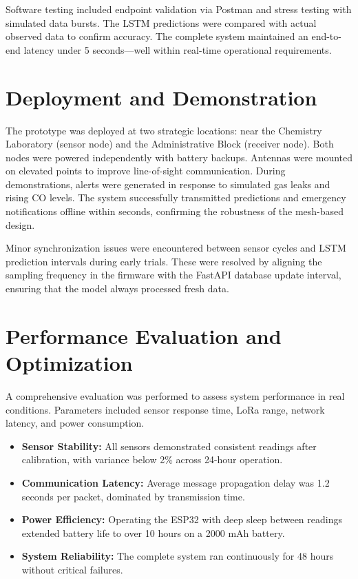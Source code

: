 Software testing included endpoint validation via Postman and stress testing with simulated data bursts. The LSTM predictions were compared with actual observed data to confirm accuracy. The complete system maintained an end-to-end latency under 5 seconds—well within real-time operational requirements.

\section{Deployment and Demonstration}
\label{sec:deployment}

The prototype was deployed at two strategic locations: near the Chemistry Laboratory (sensor node) and the Administrative Block (receiver node). Both nodes were powered independently with battery backups. Antennas were mounted on elevated points to improve line-of-sight communication. During demonstrations, alerts were generated in response to simulated gas leaks and rising CO levels. The system successfully transmitted predictions and emergency notifications offline within seconds, confirming the robustness of the mesh-based design.

Minor synchronization issues were encountered between sensor cycles and LSTM prediction intervals during early trials. These were resolved by aligning the sampling frequency in the firmware with the FastAPI database update interval, ensuring that the model always processed fresh data.

\section{Performance Evaluation and Optimization}
\label{sec:performance_eval}

A comprehensive evaluation was performed to assess system performance in real conditions. Parameters included sensor response time, LoRa range, network latency, and power consumption.

\begin{itemize}
    \item \textbf{Sensor Stability:} All sensors demonstrated consistent readings after calibration, with variance below 2\% across 24-hour operation.
    \item \textbf{Communication Latency:} Average message propagation delay was 1.2 seconds per packet, dominated by transmission time.
    \item \textbf{Power Efficiency:} Operating the ESP32 with deep sleep between readings extended battery life to over 10 hours on a 2000 mAh battery.
    \item \textbf{System Reliability:} The complete system ran continuously for 48 hours without critical failures.
\end{itemize}

